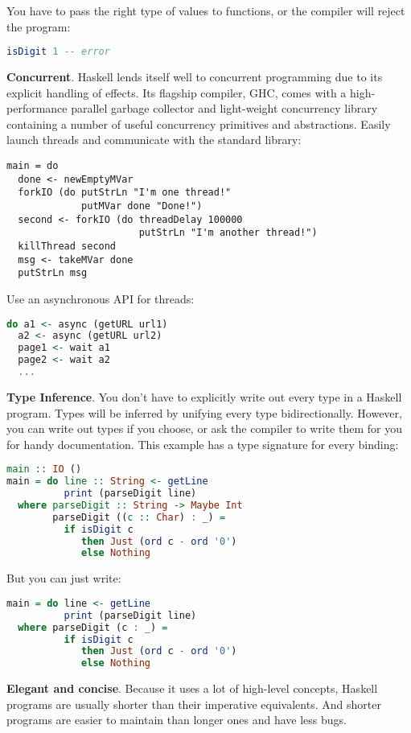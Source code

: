 \documentclass{report}
\theoremstyle{definition}
\theoremstyle{definition}
\begin{document}
You have to pass the right type of values to functions, or the compiler will reject the program:
\begin{lstlisting}[language=Haskell, caption=Statically Typed]
isDigit 1 -- error
\end{lstlisting}
\textbf{Concurrent}. Haskell lends itself well to concurrent programming due to its explicit handling of effects. Its flagship compiler, GHC, comes with a high-performance parallel garbage collector and light-weight concurrency library containing a number of useful concurrency primitives and abstractions. Easily launch threads and communicate with the standard library:
\begin{lstlisting}[caption=Concurrent]
main = do
  done <- newEmptyMVar
  forkIO (do putStrLn "I'm one thread!"
             putMVar done "Done!")
  second <- forkIO (do threadDelay 100000
                       putStrLn "I'm another thread!")
  killThread second
  msg <- takeMVar done
  putStrLn msg
\end{lstlisting}
Use an asynchronous API for threads:
\begin{lstlisting}[language=Haskell, caption=Concurrent]
do a1 <- async (getURL url1)
  a2 <- async (getURL url2)
  page1 <- wait a1
  page2 <- wait a2
  ...
\end{lstlisting}
\textbf{Type Inference}. You don't have to explicitly write out every type in a Haskell program. Types will be inferred by unifying every type bidirectionally. However, you can write out types if you choose, or ask the compiler to write them for you for handy documentation. This example has a type signature for every binding:
\begin{lstlisting}[language=Haskell, caption=Type Inference]
main :: IO ()
main = do line :: String <- getLine
          print (parseDigit line)
  where parseDigit :: String -> Maybe Int
        parseDigit ((c :: Char) : _) =
          if isDigit c
             then Just (ord c - ord '0')
             else Nothing
\end{lstlisting}
But you can just write:
\begin{lstlisting}[language=Haskell, caption=Type Inference]
main = do line <- getLine
          print (parseDigit line)
  where parseDigit (c : _) =
          if isDigit c
             then Just (ord c - ord '0')
             else Nothing
\end{lstlisting}
\textbf{Elegant and concise}. Because it uses a lot of high-level concepts, Haskell programs are usually shorter than their imperative equivalents. And shorter programs are easier to maintain than longer ones and have less bugs.
\end{document}
